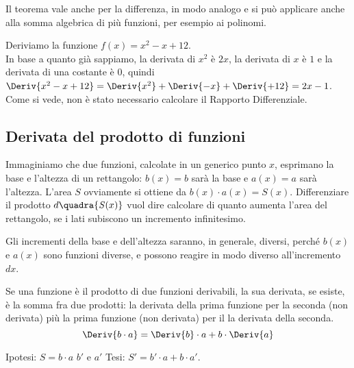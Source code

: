\begin{osservazione}
 Il teorema vale anche per la differenza, in modo analogo e si può applicare 
anche alla somma algebrica di più funzioni, per esempio ai polinomi.
\end{osservazione}

\begin{esempio}
 Deriviamo la funzione \(f(x)= x^2-x+12\).\\
 In base a quanto già sappiamo, la derivata di \(x^2\) è \(2x\), la derivata 
di \(x\) è \(1\) e la derivata di una costante è \(0\), quindi 
\(\Deriv{x^2-x+12}= 
  \Deriv{x^2} + 
  \Deriv{-x} + 
  \Deriv{+12}=
  2x-1\).\\
Come si vede, non è stato necessario calcolare il Rapporto Differenziale.
\end{esempio}

\subsection{Derivata del prodotto di funzioni}
\label{subsec:differenziazione_derivataprodotto}


Immaginiamo che due funzioni, calcolate in un generico punto \(x\),
esprimano la base e l'altezza di un rettangolo:
\(b(x)=b\) sarà la base  e \(a(x)=a\) sarà l'altezza. 
L'area \(\mathit{S}\) ovviamente si ottiene da 
\(b(x)\cdot a(x)=\mathit{S}(x)\). 
Differenziare il prodotto \(d\quadra{\mathit{S}(x)}\) vuol dire calcolare di
quanto aumenta l'area del rettangolo, se i lati subiscono un incremento 
infinitesimo. 

\begin{osservazione}
Gli incrementi della base e dell'altezza saranno, in generale, 
diversi, perché \(b(x)\) e \(a(x)\) sono funzioni diverse, e possono
reagire in modo diverso all'incremento \(dx\).
\end{osservazione}

\begin{teorema}
Se una funzione è il prodotto di due funzioni derivabili, 
la sua  derivata, se esiste, è la somma fra due prodotti: la derivata 
della prima funzione per la seconda (non derivata) più la prima funzione 
(non derivata) per il la derivata della seconda.
\[\Deriv{b \cdot a}=\Deriv{b} \cdot a + b \cdot \Deriv{a}\]
\end{teorema}
\noindent Ipotesi: \(\mathit{S} = b \cdot a\) 
\(b'\) e \(a'\) \tab 
Tesi: \(\mathit{S}' = b' \cdot a + b \cdot a'\).

